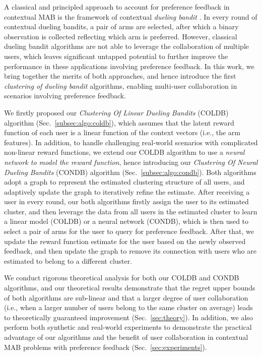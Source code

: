 A classical and principled approach to account for preference feedback in contextual MAB is the framework of contextual \emph{dueling bandit} 
\cite{NeurIPS21_saha2021optimal,ICML22_bengs2022stochastic,ALT22_saha2022efficient,arXiv24_li2024feelgood}.
In every round of contextual dueling bandits, a pair of arms are selected, after which a binary observation is collected reflecting which arm is preferred.
However, classical dueling bandit algorithms are not able to leverage the collaboration of multiple users, which leaves significant untapped potential to further improve the performance in these applications involving preference feedback.
In this work, we bring together the merits of both approaches, and hence introduce the first \emph{clustering of dueling bandit} algorithms, enabling multi-user collaboration in scenarios involving preference feedback.

We firstly proposed our \emph{Clustering Of Linear Dueling Bandits} (COLDB) algorithm (Sec.~\ref{subsec:algo:coldb}), which assumes that the latent reward function of each user is a linear function of the context vectors (i.e., the arm features). In addition, to handle challenging real-world scenarios with complicated non-linear reward functions, we extend our COLDB algorithm to use a \emph{neural network to model the reward function}, hence introducing our \emph{Clustering Of Neural Dueling Bandits} (CONDB) algorithm (Sec.~\ref{subsec:algo:condb}).
Both algorithms adopt a graph to represent the estimated clustering structure of all users, and adaptively update the graph to iteratively refine the estimate. After receiving a user in every round, our both algorithms firstly assign the user to its estimated cluster, and then leverage the data from all users in the estimated cluster to learn a linear model (COLDB) or a neural network (CONDB), which is then used to select a pair of arms for the user to query for preference feedback. After that, we update the reward function estimate for the user based on the newly observed feedback, and then update the graph to remove its connection with users who are estimated to belong to a different cluster.

We conduct rigorous theoretical analysis for both our COLDB and CONDB algorithms, and our theoretical results demonstrate that the regret upper bounds of both algorithms are sub-linear and that a larger degree of user collaboration (i.e., when a larger number of users belong to the same cluster on average) leads to theoretically guaranteed improvement (Sec.~\ref{sec:theory}).
In addition, we also perform both synthetic and real-world experiments to demonstrate the practical advantage of our algorithms and the benefit of user collaboration in contextual MAB problems with preference feedback (Sec.~\ref{sec:experiments}).
